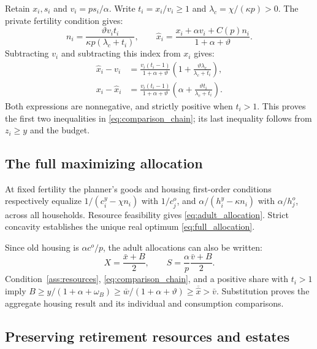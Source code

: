 \documentclass[11pt]{article}
\newcommand{\avg}[1]{\overline{#1}}
\begin{document}
Retain $x_i,s_i$ and $v_i=ps_i/\alpha$. Write $t_i=x_i/v_i\ge1$ and
$\lambda_c=\chi/(\kappa p)>0$. The private fertility condition gives:
\begin{equation}
n_i=\frac{\vartheta v_i t_i}{\kappa p(\lambda_c+t_i)},\qquad
\widehat x_i=\frac{x_i+\alpha v_i+C(p)n_i}{1+\alpha+\vartheta}.
\label{eq:index_identity}
\end{equation}
Subtracting $v_i$ and subtracting this index from $x_i$ gives:
\begin{align}
\widehat x_i-v_i
 &=\frac{v_i(t_i-1)}{1+\alpha+\vartheta}
   \left(1+\frac{\vartheta\lambda_c}{\lambda_c+t_i}\right),\\
x_i-\widehat x_i
 &=\frac{v_i(t_i-1)}{1+\alpha+\vartheta}
   \left(\alpha+\frac{\vartheta t_i}{\lambda_c+t_i}\right).
\end{align}
Both expressions are nonnegative, and strictly positive when $t_i>1$.
This proves the first two inequalities in \eqref{eq:comparison_chain};
its last inequality follows from $z_i\ge y$ and the budget.

\subsection{The full maximizing allocation}

At fixed fertility the planner's goods and housing first-order conditions
respectively equalize $1/(c_i^y-\chi n_i)$ with $1/c_j^o$, and
$\alpha/(h_i^y-\kappa n_i)$ with $\alpha/h_j^o$, across all households.
Resource feasibility gives \eqref{eq:adult_allocation}. Strict concavity
establishes the unique real optimum \eqref{eq:full_allocation}.

Since old housing is $\alpha c^o/p$, the adult allocations can also be
written:
\begin{equation}
X=\frac{\bar x+B}{2},\qquad
S=\frac{\alpha}{p}\frac{\bar v+B}{2}.
\end{equation}
Condition~\eqref{ass:resources}, \eqref{eq:comparison_chain}, and a positive
share with $t_i>1$ imply $B\ge y/(1+\alpha+\omega_B)\ge\bar w/(1+\alpha+\vartheta)\ge
\avg{\widehat x}>\bar v$. Substitution proves the aggregate housing result
and its individual and consumption comparisons.

\subsection{Preserving retirement resources and estates}
\end{document}
